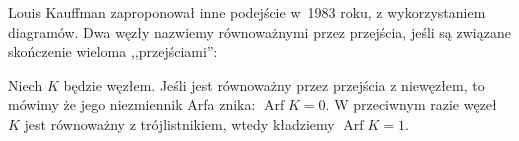 Louis Kauffman zaproponował inne podejście w~1983 roku, z wykorzystaniem diagramów.
Dwa węzły nazwiemy równoważnymi przez przejścia, jeśli są związane skończenie wieloma ,,przejściami'':
\begin{comment}
\[
    \begin{tikzpicture}[baseline=-0.65ex,scale=0.35]
    \begin{knot}[clip width=7]
        \strand[-latex, thick] (-2.5,-1.0) to (2.5,-1.0);
        \strand[-latex, thick] (2.5,1.0) to (-2.5,1.0);
        \strand[-latex, thick] (-1.0,-2.5) to (-1.0,2.5);
        \strand[-latex, thick] (1.0,2.5) to (1.0,-2.5);
    \end{knot}
    \end{tikzpicture}
    \cong
    \begin{tikzpicture}[baseline=-0.65ex,scale=0.35]
    \begin{knot}[clip width=7, flip crossing/.list={1,2,3,4}]
        \strand[-latex, thick] (-2.5,-1.0) to (2.5,-1.0);
        \strand[-latex, thick] (2.5,1.0) to (-2.5,1.0);
        \strand[-latex, thick] (-1.0,-2.5) to (-1.0,2.5);
        \strand[-latex, thick] (1.0,2.5) to (1.0,-2.5);
    \end{knot}
    \end{tikzpicture}
    \quad\mbox{albo}\quad
    \begin{tikzpicture}[baseline=-0.65ex,scale=0.35]
    \begin{knot}[clip width=7]
        \strand[-latex, thick] (-2.5,-1.0) to (2.5,-1.0);
        \strand[-latex, thick] (2.5,1.0) to (-2.5,1.0);
        \strand[latex-, thick] (-1.0,-2.5) to (-1.0,2.5);
        \strand[latex-, thick] (1.0,2.5) to (1.0,-2.5);
    \end{knot}
    \end{tikzpicture}
    \cong
    \begin{tikzpicture}[baseline=-0.65ex,scale=0.35]
    \begin{knot}[clip width=7, flip crossing/.list={1,2,3,4}]
        \strand[-latex, thick] (-2.5,-1.0) to (2.5,-1.0);
        \strand[-latex, thick] (2.5,1.0) to (-2.5,1.0);
        \strand[latex-, thick] (-1.0,-2.5) to (-1.0,2.5);
        \strand[latex-, thick] (1.0,2.5) to (1.0,-2.5);
    \end{knot}
    \end{tikzpicture}
\]
\end{comment}

\begin{definition}[Kauffman, 1983]
    Niech $K$ będzie węzłem.
    Jeśli jest równoważny przez przejścia z niewęzłem, to mówimy że jego niezmiennik Arfa znika: $\operatorname{Arf} K = 0$.
    W przeciwnym razie węzeł $K$ jest równoważny z trójlistnikiem, wtedy kładziemy $\operatorname{Arf} K = 1$.
\end{definition}

